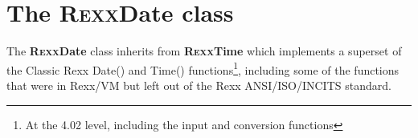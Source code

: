 \section{The R\textsc{exx}Date class}\label{refrexxio}
 
The \textbf{R\textsc{exx}Date} class inherits from \textbf{R\textsc{exx}Time} which implements a superset of the Classic Rexx Date() and Time() functions\footnote{At the 4.02 level, including the input and conversion functions}, including some of the functions that were in Rexx/VM but left out of the Rexx ANSI/ISO/INCITS standard.
